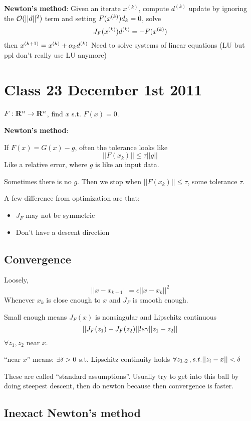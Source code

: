 \textbf{Newton's method}: Given an iterate $x^{(k)}$, compute
$d^{(k)}$ update by ignoring the $\mathcal{O}(||d||^2)$ term and setting
$F(x^{(k)})d_k = 0$, solve $$J_F(x^{(k)})d^{(k)} = -F(x^{(k)})$$
then $x^{(k+1)}  = x^{(k)} + \alpha_kd^{(k)}$
Need to solve systems of linear equations (LU but ppl don't really use LU anymore)
\pagebreak
\section{Class 23 December 1st 2011}
$F:\mathbf{R}^n \rightarrow \mathbf{R}^n$, find $x$ s.t. $F(x)=0$. 

\textbf{Newton's method}: 
\begin{algorithmic}
\REPEAT
{}
\end{algorithmic}


 If $F(x) = G(x) - g$, often the tolerance looks like
$$||F(x_k)||\le \tau||g||$$
Like a relative error, where $g$ is like an input data.

Sometimes there is no $g$. Then we stop when $||F(x_k)||\le \tau$,
some tolerance $\tau$.

A few difference from optimization are that:
\begin{itemize}
\item $J_F$ may not be symmetric
\item Don't have a descent direction
\end{itemize}

\subsection{Convergence}

Loosely, $$||x-x_{k+1}|| = c||x-x_k||^2$$
Whenever $x_k$ is close enough to $x$ and $J_F$ is smooth enough.

Small enough means $J_F(x)$ is nonsingular and Lipschitz
continuous $$||J_F(z_1) - J_F(z_2)|| le \gamma ||z_1 - z_2||$$
$\forall z_1,z_2$ near $x$.

``near $x$'' means: $\exists \delta > 0$ s.t. Lipschitz continuity holds
$\forall z_1,_2, s.t. ||z_i - x|| < \delta$

These are called ``standard assumptions''. Usually try to get into
this ball by doing steepest descent, then do newton because then
convergence is faster.

\subsection{Inexact Newton's method}


